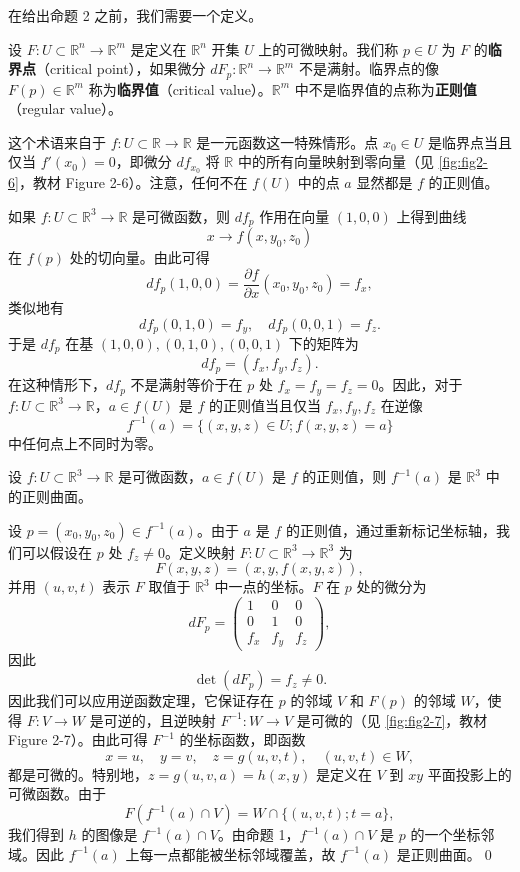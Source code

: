 在给出命题 2 之前，我们需要一个定义。

\begin{Definition}[临界点与正则值]\label{def:critical-regular-value}
设 $F: U \subset \mathbb{R}^n \to \mathbb{R}^m$ 是定义在 $\mathbb{R}^n$ 开集 $U$ 上的可微映射。我们称 $p \in U$ 为 $F$ 的\textbf{临界点}（critical point），如果微分 $dF_p: \mathbb{R}^n \to \mathbb{R}^m$ 不是满射。临界点的像 $F(p) \in \mathbb{R}^m$ 称为\textbf{临界值}（critical value）。$\mathbb{R}^m$ 中不是临界值的点称为\textbf{正则值}（regular value）。
\end{Definition}

这个术语来自于 $f: U \subset \mathbb{R} \to \mathbb{R}$ 是一元函数这一特殊情形。点 $x_0 \in U$ 是临界点当且仅当 $f'(x_0) = 0$，即微分 $df_{x_0}$ 将 $\mathbb{R}$ 中的所有向量映射到零向量（见 \cref{fig:fig2-6}，教材 Figure 2-6）。注意，任何不在 $f(U)$ 中的点 $a$ 显然都是 $f$ 的正则值。

如果 $f: U \subset \mathbb{R}^3 \to \mathbb{R}$ 是可微函数，则 $df_p$ 作用在向量 $(1,0,0)$ 上得到曲线
\[
x \longrightarrow f(x, y_0, z_0)
\]
在 $f(p)$ 处的切向量。由此可得
\[
df_p(1,0,0) = \frac{\partial f}{\partial x}(x_0, y_0, z_0) = f_x,
\]
类似地有
\[
df_p(0,1,0) = f_y,\quad df_p(0,0,1) = f_z.
\]
于是 $df_p$ 在基 $(1,0,0), (0,1,0), (0,0,1)$ 下的矩阵为
\[
df_p = (f_x, f_y, f_z).
\]
在这种情形下，$df_p$ 不是满射等价于在 $p$ 处 $f_x = f_y = f_z = 0$。因此，对于 $f: U \subset \mathbb{R}^3 \to \mathbb{R}$，$a \in f(U)$ 是 $f$ 的正则值当且仅当 $f_x, f_y, f_z$ 在逆像
\[
f^{-1}(a) = \{(x,y,z) \in U; f(x,y,z) = a\}
\]
中任何点上不同时为零。

\begin{Proposition}[正则值原像是正则曲面]\label{prop:regular-value-surface}
设 $f: U \subset \mathbb{R}^3 \to \mathbb{R}$ 是可微函数，$a \in f(U)$ 是 $f$ 的正则值，则 $f^{-1}(a)$ 是 $\mathbb{R}^3$ 中的正则曲面。
\end{Proposition}

\begin{Proof}
设 $p = (x_0, y_0, z_0) \in f^{-1}(a)$。由于 $a$ 是 $f$ 的正则值，通过重新标记坐标轴，我们可以假设在 $p$ 处 $f_z \neq 0$。定义映射 $F: U \subset \mathbb{R}^3 \to \mathbb{R}^3$ 为
\[
F(x,y,z) = (x, y, f(x,y,z)),
\]
并用 $(u,v,t)$ 表示 $F$ 取值于 $\mathbb{R}^3$ 中一点的坐标。$F$ 在 $p$ 处的微分为
\[
dF_p = \begin{pmatrix} 1 & 0 & 0 \\ 0 & 1 & 0 \\ f_x & f_y & f_z \end{pmatrix},
\]
因此
\[
\det(dF_p) = f_z \neq 0.
\]
因此我们可以应用逆函数定理，它保证存在 $p$ 的邻域 $V$ 和 $F(p)$ 的邻域 $W$，使得 $F: V \to W$ 是可逆的，且逆映射 $F^{-1}: W \to V$ 是可微的（见 \cref{fig:fig2-7}，教材 Figure 2-7）。由此可得 $F^{-1}$ 的坐标函数，即函数
\[
x = u,\quad y = v,\quad z = g(u,v,t),\quad (u,v,t) \in W,
\]
都是可微的。特别地，$z = g(u,v,a) = h(x,y)$ 是定义在 $V$ 到 $xy$ 平面投影上的可微函数。由于
\[
F(f^{-1}(a) \cap V) = W \cap \{(u,v,t); t = a\},
\]
我们得到 $h$ 的图像是 $f^{-1}(a) \cap V$。由命题 1，$f^{-1}(a) \cap V$ 是 $p$ 的一个坐标邻域。因此 $f^{-1}(a)$ 上每一点都能被坐标邻域覆盖，故 $f^{-1}(a)$ 是正则曲面。\qed
\end{Proof}

